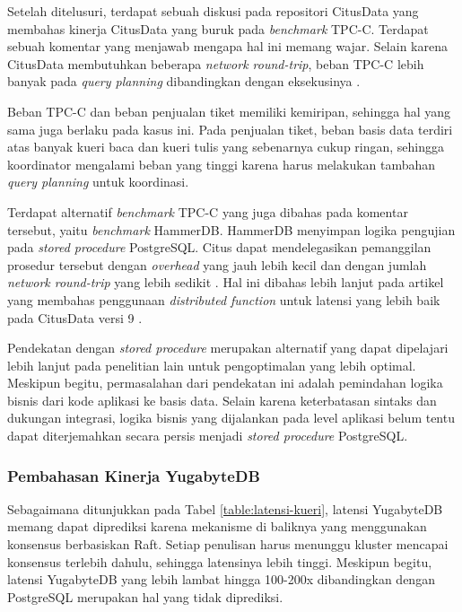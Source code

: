 Setelah ditelusuri, terdapat sebuah diskusi pada repositori CitusData yang membahas kinerja CitusData yang buruk pada \textit{benchmark} TPC-C. Terdapat sebuah komentar yang menjawab mengapa hal ini memang wajar. Selain karena CitusData membutuhkan beberapa \textit{network round-trip}, beban TPC-C lebih banyak pada \textit{query planning} dibandingkan dengan eksekusinya \parencite{Slot2020}.

Beban TPC-C dan beban penjualan tiket memiliki kemiripan, sehingga hal yang sama juga berlaku pada kasus ini. Pada penjualan tiket, beban basis data terdiri atas banyak kueri baca dan kueri tulis yang sebenarnya cukup ringan, sehingga koordinator mengalami beban yang tinggi karena harus melakukan tambahan \textit{query planning} untuk koordinasi.

Terdapat alternatif \textit{benchmark} TPC-C yang juga dibahas pada komentar tersebut, yaitu \textit{benchmark} HammerDB. HammerDB menyimpan logika pengujian pada \textit{stored procedure} PostgreSQL. Citus dapat mendelegasikan pemanggilan prosedur tersebut dengan \textit{overhead} yang jauh lebih kecil dan dengan jumlah \textit{network round-trip} yang lebih sedikit \parencite{Slot2020}. Hal ini dibahas lebih lanjut pada artikel yang membahas penggunaan \textit{distributed function} untuk latensi yang lebih baik pada CitusData versi 9 \parencite{Slot2020faster}.

Pendekatan dengan \textit{stored procedure} merupakan alternatif yang dapat dipelajari lebih lanjut pada penelitian lain untuk pengoptimalan yang lebih optimal. Meskipun begitu, permasalahan dari pendekatan ini adalah pemindahan logika bisnis dari kode aplikasi ke basis data. Selain karena keterbatasan sintaks dan dukungan integrasi, logika bisnis yang dijalankan pada level aplikasi belum tentu dapat diterjemahkan secara persis menjadi \textit{stored procedure} PostgreSQL.

\subsubsection{Pembahasan Kinerja YugabyteDB}

Sebagaimana ditunjukkan pada Tabel \ref{table:latensi-kueri}, latensi YugabyteDB memang dapat diprediksi karena mekanisme di baliknya yang menggunakan konsensus berbasiskan Raft. Setiap penulisan harus menunggu kluster mencapai konsensus terlebih dahulu, sehingga latensinya lebih tinggi. Meskipun begitu, latensi YugabyteDB yang lebih lambat hingga 100-200x dibandingkan dengan PostgreSQL merupakan hal yang tidak diprediksi.

